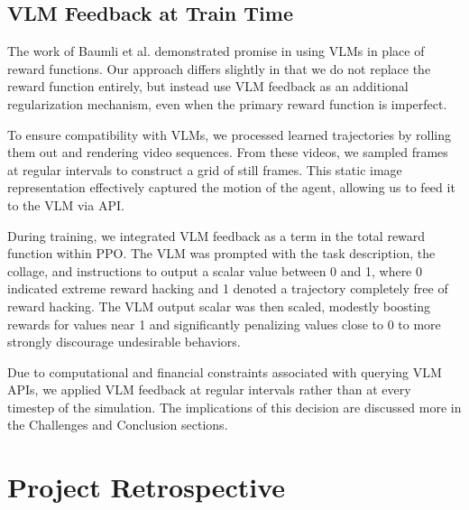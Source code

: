 \documentclass{article}
\begin{document}
\subsection{VLM Feedback at Train Time}
The work of Baumli et al. \cite{baumli2024visionlanguagemodelssourcerewards} demonstrated promise in using VLMs in place of reward functions. Our approach differs slightly in that we do not replace the reward function entirely, but instead use VLM feedback as an additional regularization mechanism, even when the primary reward function is imperfect.

To ensure compatibility with VLMs, we processed learned trajectories by rolling them out and rendering video sequences. From these videos, we sampled frames at regular intervals to construct a grid of still frames. This static image representation effectively captured the motion of the agent, allowing us to feed it to the VLM via API. 

During training, we integrated VLM feedback as a term in the total reward function within PPO. The VLM was prompted with the task description, the collage, and instructions to output a scalar value between 0 and 1, where 0 indicated extreme reward hacking and 1 denoted a trajectory completely free of reward hacking. The VLM output scalar was then scaled, modestly boosting rewards for values near 1 and significantly penalizing values close to 0 to more strongly discourage undesirable behaviors. 

Due to computational and financial constraints associated with querying VLM APIs, we applied VLM feedback at regular intervals rather than at every timestep of the simulation. The implications of this decision are discussed more in the Challenges and Conclusion sections.


\section{Project Retrospective}
\end{document}
